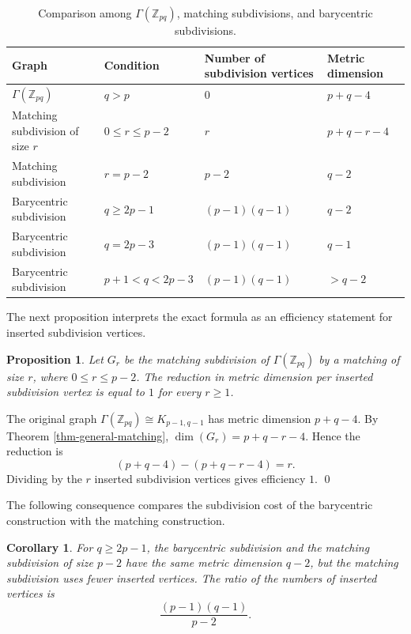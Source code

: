 \documentclass[12pt]{article}
\renewenvironment{proof}{{\bf \noindent Proof.}}{\qed}
\newtheorem{proposition}[theorem]{Proposition}
\newtheorem{corollary}[theorem]{Corollary}
\begin{document}
\begin{table}[H]
\centering
\caption{Comparison among $\Gamma(\mathbb Z_{pq})$, matching subdivisions, and barycentric subdivisions.}
\label{tab:comparison}
\begin{tabular}{|>{\centering\arraybackslash}p{}|>{\centering\arraybackslash}p{}|>{\centering\arraybackslash}p{}|>{\centering\arraybackslash}p{}|}
\hline
Graph & Condition & Number of subdivision vertices & Metric dimension \\
\hline
$\Gamma(\mathbb Z_{pq})$ & $q>p$ & $0$ & $p+q-4$ \\
\hline
Matching subdivision of size $r$ & $0\leq r\leq p-2$ & $r$ & $p+q-r-4$ \\
\hline
Matching subdivision & $r=p-2$ & $p-2$ & $q-2$ \\
\hline
Barycentric subdivision & $q\geq 2p-1$ & $(p-1)(q-1)$ & $q-2$ \\
\hline
Barycentric subdivision & $q=2p-3$ & $(p-1)(q-1)$ & $q-1$ \\
\hline
Barycentric subdivision & $p+1<q<2p-3$ & $(p-1)(q-1)$ & $>q-2$ \\
\hline
\end{tabular}
\end{table}

\noindent The next proposition interprets the exact formula as an efficiency statement for inserted subdivision vertices.
\begin{proposition}\label{prop-efficiency}
Let $G_r$ be the matching subdivision of $\Gamma(\mathbb Z_{pq})$ by a matching of size $r$, where $0\leq r\leq p-2$. The reduction in metric dimension per inserted subdivision vertex is equal to $1$ for every $r\geq 1$.
\end{proposition}

\begin{proof}
The original graph $\Gamma(\mathbb Z_{pq})\cong K_{p-1,q-1}$ has metric dimension $p+q-4$. By Theorem \ref{thm-general-matching}, $\dim(G_r)=p+q-r-4$. Hence the reduction is
$$
(p+q-4)-(p+q-r-4)=r.
$$
Dividing by the $r$ inserted subdivision vertices gives efficiency $1$.
\end{proof}

\noindent The following consequence compares the subdivision cost of the barycentric construction with the matching construction.
\begin{corollary}\label{cor-barycentric-efficiency}
For $q\geq 2p-1$, the barycentric subdivision and the matching subdivision of size $p-2$ have the same metric dimension $q-2$, but the matching subdivision uses fewer inserted vertices. The ratio of the numbers of inserted vertices is
$$
\frac{(p-1)(q-1)}{p-2}.
$$
\end{corollary}
\end{document}
